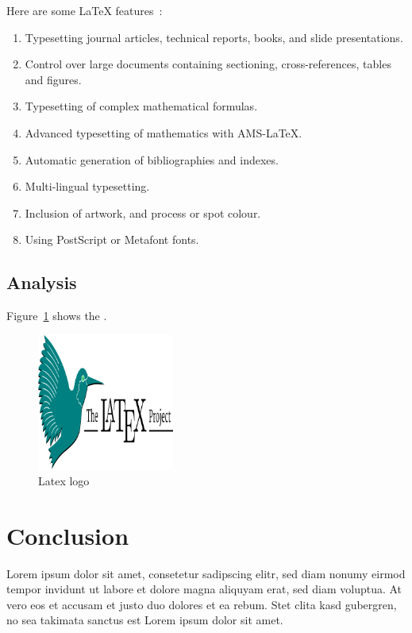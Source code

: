 \documentclass[12pt]{article}
\begin{document}
Here are some LaTeX features~\cite{latex-page}:

\begin{displayquote}
  \begin{enumerate}
    \item Typesetting journal articles, technical reports, books, and slide presentations.
    \item Control over large documents containing sectioning, cross-references, tables and figures.
    \item Typesetting of complex mathematical formulas.
    \item Advanced typesetting of mathematics with AMS-LaTeX.
    \item Automatic generation of bibliographies and indexes.
    \item Multi-lingual typesetting.
    \item Inclusion of artwork, and process or spot colour.
    \item Using PostScript or Metafont fonts.
  \end{enumerate}
\end{displayquote}

\subsection{Analysis}%

Figure~\ref{fig:-latex-logo} shows the \LaTeXlogo.

\begin{figure}[htpb]
  \centering
  \includegraphics[width=0.4\textwidth]{./img/latex-project-logo.png}
  \caption{Latex logo}
  \label{fig:-latex-logo} %
\end{figure}

\section{Conclusion}%
\label{sec:conclusion}

Lorem ipsum dolor sit amet, consetetur sadipscing elitr, sed diam nonumy eirmod tempor invidunt ut labore et dolore magna aliquyam erat, sed diam voluptua. At vero eos et accusam et justo duo dolores et ea rebum. Stet clita kasd gubergren, no sea takimata sanctus est Lorem ipsum dolor sit amet.



\end{document}
